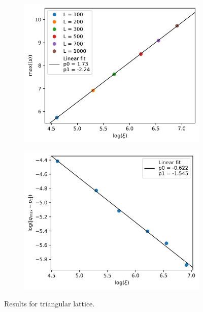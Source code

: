 \documentclass[a4paper]{article}
\begin{document}
\begin{figure}[h]
\begin{subfigure}[b]{0.49\textwidth}
        \caption{}
    \end{subfigure}
    \\\vspace{4mm}%
    \begin{subfigure}[b]{0.49\textwidth}
        \includegraphics[width=\textwidth]{triangular_clustersize_vs_xi.png}
        \caption{}
    \end{subfigure}
    \begin{subfigure}[b]{0.49\textwidth}
        \includegraphics[width=\textwidth]{triangular_qmax_vs_xi.png}
        \caption{}
    \end{subfigure}
    \caption{Results for triangular lattice. \label{fig:triangular_results}}
\end{figure}
\end{document}
